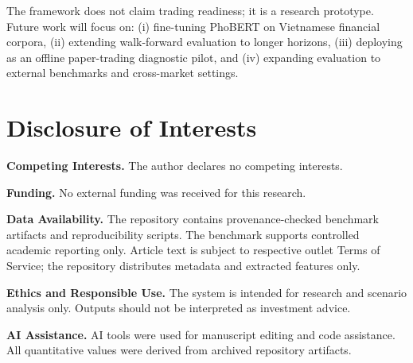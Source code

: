 \documentclass[runningheads]{llncs}
\begin{document}
The framework does not claim trading readiness; it is a research prototype. Future work will focus on: (i) fine-tuning PhoBERT on Vietnamese financial corpora, (ii) extending walk-forward evaluation to longer horizons, (iii) deploying as an offline paper-trading diagnostic pilot, and (iv) expanding evaluation to external benchmarks and cross-market settings.

\section*{Disclosure of Interests}

\textbf{Competing Interests.}
The author declares no competing interests.

\textbf{Funding.}
No external funding was received for this research.

\textbf{Data Availability.}
The repository contains provenance-checked benchmark artifacts and reproducibility scripts. The benchmark supports controlled academic reporting only. Article text is subject to respective outlet Terms of Service; the repository distributes metadata and extracted features only.

\textbf{Ethics and Responsible Use.}
The system is intended for research and scenario analysis only. Outputs should not be interpreted as investment advice.

\textbf{AI Assistance.}
AI tools were used for manuscript editing and code assistance. All quantitative values were derived from archived repository artifacts.




\end{document}
